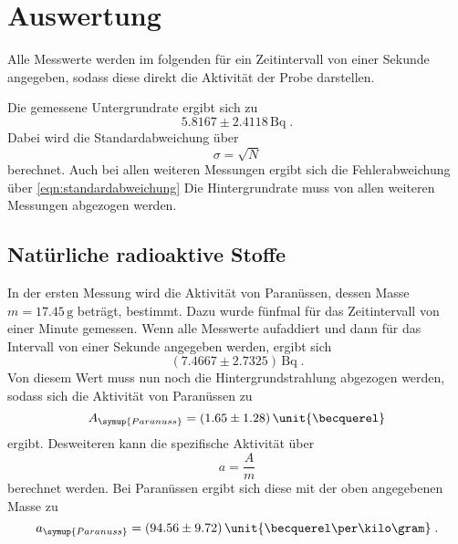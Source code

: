 \section{Auswertung}
\label{sec:Auswertung}

%
Alle Messwerte werden im folgenden für ein Zeitintervall von einer Sekunde angegeben, sodass diese direkt die Aktivität der Probe darstellen.

Die gemessene Untergrundrate ergibt sich zu
\begin{equation*}
    5.8167 \pm 2.4118 \,\unit{\becquerel} \; .
\end{equation*}
Dabei wird die Standardabweichung über 
\begin{equation}
    \sigma = \sqrt{N}
    \label{eqn:standardabweichung}
\end{equation}
berechnet. Auch bei allen weiteren Messungen ergibt sich die Fehlerabweichung über \autoref{eqn:standardabweichung}
Die Hintergrundrate muss von allen weiteren Messungen abgezogen werden.

\subsection{Natürliche radioaktive Stoffe}
\label{sec:stoffe}
In der ersten Messung wird die Aktivität von Paranüssen, dessen Masse $m = 17.45 \, \unit{\gram}$ beträgt, bestimmt. Dazu wurde fünfmal für das Zeitintervall 
von einer Minute gemessen. Wenn alle Messwerte aufaddiert und dann für das Intervall von einer Sekunde angegeben werden, ergibt sich 
\begin{equation*}
    (7.4667 \pm 2.7325) \, \unit{\becquerel} \; .
\end{equation*}
Von diesem  Wert muss nun noch die Hintergrundstrahlung abgezogen werden, sodass sich die Aktivität von Paranüssen zu 
\begin{equation*}
    A_{\symup{Paranuss}} = (1.65 \pm 1.28) \, \unit{\becquerel} 
\end{equation*}
ergibt. Desweiteren kann die spezifische Aktivität über
\begin{equation}
    a = \frac{A}{m}
    \label{eqn:spezAkt}
\end{equation}
berechnet werden. Bei Paranüssen ergibt sich diese mit der oben angegebenen Masse zu 
\begin{equation*}
    a_{{\symup{Paranuss}}} = (94.56 \pm 9.72) \, \unit{\becquerel \per \kilo\gram} \; .
\end{equation*}

